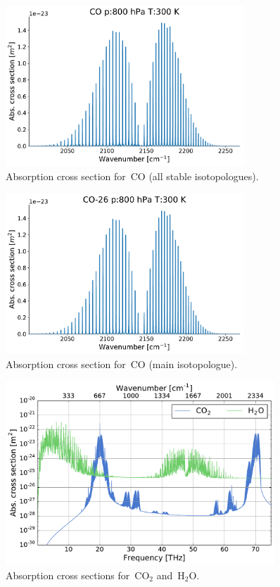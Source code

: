 \documentclass[paper=a4, fontsize=11pt]{scrartcl} %
\newcommand{\symb}[1]{$\,\mathrm{#1}$}
\begin{document}
\clearpage
\begin{figure}[h!]
  \centering
  \includegraphics[width=0.8\textwidth]{plots/plot_xsec_CO_800hPa_300K.pdf}
  \caption{Absorption cross section for \symb{CO} (all stable isotopologues).}
  \label{fig:abs_xsec_CO}
\end{figure}
\vfill
\begin{figure}[h!]
  \centering
  \includegraphics[width=0.8\textwidth]{plots/plot_xsec_CO-26_800hPa_300K.pdf}
  \caption{Absorption cross section for \symb{CO} (main isotopologue).}
  \label{fig:abs_xsec_CO_main}
\end{figure}

\begin{figure}[ht]
  \includegraphics[angle=90, width=0.9\textwidth]{plots/abs_xsec_overview.pdf}
  \caption{Absorption cross sections for \symb{CO_2} and \symb{H_2O}.}
  \label{fig:abs_xsec_overview}
\end{figure}
\end{document}
